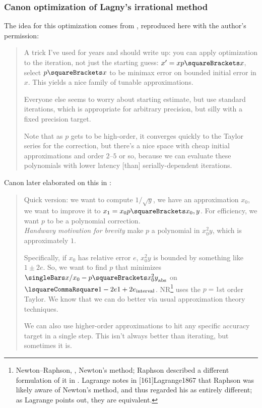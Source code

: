 ﻿\documentclass[10pt, a4paper, twoside]{basestyle}
\begin{document}
\subsubsection*{Canon optimization of Lagny's irrational method}
The idea for this optimization comes from \cite{Canon2018a}, reproduced here with the author’s permission:
\begin{quotation}
 A trick I’ve used for years and should write up: you can apply optimization to the iteration,
 not just the starting guess: $x' = x p\of x$, select $p\of x$ to be minimax error on bounded
 initial error in $x$. This yields a nice family of tunable approximations.

 Everyone else seems to worry about starting estimate, but use standard iterations,
 which is appropriate for arbitrary precision, but silly with a fixed precision target.

 Note that as $p$ gets to be high-order, it converges quickly to the Taylor series for the
 correction, but there's a nice space with cheap initial approximations and order $2$--$5$ or
 so, because we can evaluate these polynomials with lower latency [than] serially-dependent
 iterations.
\end{quotation}
Canon later elaborated on this in \cite{Canon2018b}:
\begin{quotation}
 Quick version: we want to compute $1/\sqrt{y}$, we have an approximation $x_0$, we want to
 improve it to $x_1 = x_0 p\of{x_0, y}$. For efficiency, we want $p$ to be a polynomial correction.\\
 \textit{Handwavy motivation for brevity} make $p$ a polynomial in $x_0^2y$, which is approximately $1$.

 Specifically, if $x_0$ has relative error $e$, $x_0^2y$ is bounded by something like $1 \pm 2e$.
 So, we want to find $p$ that minimizes $\abs{x/x_0 - p\of{x_0^2y}}$ on $\intclos{1-2e}{1+2e}$.
 NR\footnote{Newton--Raphson, \idest, Newton's method; Raphson described a different formulation of it in \cite{Raphson1690}.
Lagrange notes in [161]{Lagrange1867} that Raphson was likely aware of Newton's method, and thus
regarded his as entirely different; as Lagrange points out, they are equivalent.}
uses the $p = 1$st order Taylor. We know that we can do better via usual approximation theory techniques.

 We can also use higher-order approximations to hit any specific accuracy target in a single step.
 This isn't always better than iterating, but sometimes it is.
\end{quotation}
\end{document}
